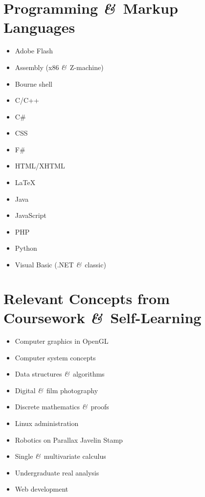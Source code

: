 \documentclass[11pt]{simplecv}
\newcommand*\amp{{\fertigopro\itshape\&}}
\begin{document}
  \newpage

  \section{Programming \amp\ Markup Languages}
  \begin{multicols}{2}
    \begin{itemize}
      \item Adobe Flash
      \item Assembly (x86 \amp\ Z-machine)
      \item Bourne shell
      \item C/C++
      \item C\#
      \item CSS
      \item F\#
      \item HTML/XHTML
      \item \LaTeX
      \item Java
      \item JavaScript
      \item PHP
      \item Python
      \item Visual Basic (.NET \amp\ classic)
    \end{itemize}
  \end{multicols}

  \section{Relevant Concepts from Coursework \amp\ Self-Learning}
  \begin{multicols}{2}
    \begin{itemize}
      \item Computer graphics in OpenGL
      \item Computer system concepts
      \item Data structures \amp\ algorithms
      \item Digital \amp\ film photography
      \item Discrete mathematics \amp\ proofs
      \item Linux administration
      \item Robotics on Parallax Javelin Stamp
      \item Single \amp\ multivariate calculus
      \item Undergraduate real analysis
      \item Web development
    \end{itemize}
  \end{multicols}
\end{document}

